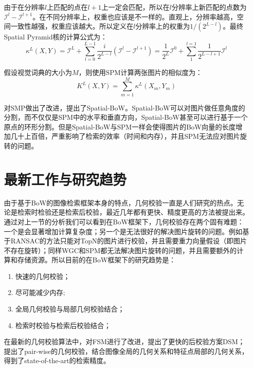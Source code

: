 由于在分辨率$l$上匹配的点在$l+1$上一定会匹配，所以在$l$分辨率上新匹配的点数为$\mathcal{I}^l - \mathcal{I}^{l+1}$。在不同分辨率上，权重也应该是不一样的。直观上，分辨率越高，空间一致性越强，权重应该越大。所以定义在$l$分辨率上的权重为$1/(2^{L-l})$。最终Spatial Pyramid核的计算公式为：
\begin{equation}
\kappa^L(X,Y) = \mathcal{I}^L + \sum_{l=0}^{L-1}\frac{i}{2^{L-l}}(\mathcal{I}^l - \mathcal{I}^{l+1}) = \frac{1}{2^L}\mathcal{I}^0 + \sum_{1}^{l=1}\frac{1}{2^{L-l+1}}\mathcal{I}^l
\end{equation}

假设视觉词典的大小为$M$，则使用SPM计算两张图片的相似度为：
\begin{equation}
K^L(X,Y) = \sum_{m=1}^{M}\kappa^L(X_m, Y_m)
\end{equation}

\cite{Cao2010Spatial}对SMP做出了改进，提出了Spatial-BoW。Spatial-BoW可以对图片做任意角度的分割，而不仅仅是SPM中的水平和垂直方向，Spatial-BoW甚至可以进行基于一个原点的环形分割。但是Spatial-BoW与SPM一样会使得图片的BoW向量的长度增加几十上百倍，严重影响了检索的效率（时间和内存），并且SPM无法应对图片旋转的问题。



\section{最新工作与研究趋势}
由于基于BoW的图像检索框架本身的特点，几何校验一直是人们研究的热点。无论是检索时检验还是检索后校验，最近几年都有更快、精度更高的方法被提出来。通过对上一节的分析我们可以看到在BoW框架下，几何校验存在两个固有难题：一个是会显著增加计算复杂度；另一个是无法很好的解决图片旋转的问题。例如基于RANSAC的方法\cite{philbin2007object}\cite{chum2007total}只能对TopN的图片进行校验，并且需要重力向量假设（即图片不存在旋转）；同样WGC和SPM都无法解决图片旋转的问题，并且需要额外的计算和存储资源。所以目前的在BoW框架下的研究趋势是：
\begin{enumerate}
	\item 快速的几何校验；
	\item 尽可能减少内存;
	\item 全局几何校验与局部几何校验结合；
	\item 检索时校验与检索后校验结合；
\end{enumerate}

在最新的几何校验算法中，\cite{Zhong2015Fast}对FSM进行了改进，提出了更快的后校验方案DSM；\cite{li2015pairwise}提出了pair-wise的几何校验，结合图像全局的几何关系和特征点局部的几何关系，得到了state-of-the-art的检索精度。

